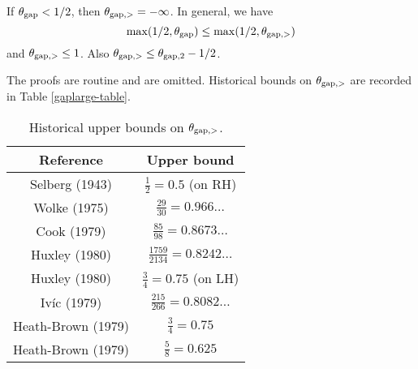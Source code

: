 \begin{proposition}\label{trivial-large-gap}  If $\theta_{\mathrm{gap}} < 1/2$, then $\theta_{\mathrm{gap},>} = -\infty$.  In general, we have
    $$ \max(1/2,\theta_{\mathrm{gap}}) \leq \max(1/2, \theta_{\mathrm{gap},>})$$
    and $\theta_{\mathrm{gap},>} \leq 1$.  Also $\theta_{\mathrm{gap},>} \leq \theta_{\mathrm{gap},2} - 1/2$.
\end{proposition}

The proofs are routine and are omitted.  Historical bounds on $\theta_{\mathrm{gap},>}$ are recorded in Table \ref{gaplarge-table}.

\begin{table}[ht]
    \caption{Historical upper bounds on $\theta_{\mathrm{gap},>}$.}
    \centering
    \renewcommand{\arraystretch}{1.2}
    \begin{tabular}{|c|c|}
    \hline
    Reference & Upper bound \\
    \hline
    Selberg (1943) \cite{selberg_1943} & $\frac{1}{2}=0.5$ (on RH)\\
    \hline
    Wolke (1975) \cite{wolke_1975} & $\frac{29}{30} = 0.966\dots$ \\
    \hline
    Cook (1979) \cite{cook_1979} & $\frac{85}{98} = 0.8673\dots$ \\
    \hline
    Huxley (1980) \cite{huxley_large_1980} & $\frac{1759}{2134} = 0.8242\dots$ \\
    \hline
    Huxley (1980) \cite{huxley_large_1980} & $\frac{3}{4} = 0.75$ (on LH) \\
    \hline
    Iv\'ic (1979) \cite{ivic_sums_1979} & $\frac{215}{266} = 0.8082\dots$ \\
    \hline
    Heath-Brown (1979) \cite{heath_brown_consecutive_III} & $\frac{3}{4} = 0.75$ \\
    \hline
    Heath-Brown (1979) \cite{heath_brown_consecutive_II} & $\frac{5}{8} = 0.625$ \\
    \hline
    \end{tabular}
\end{table}\label{gaplarge-table}
